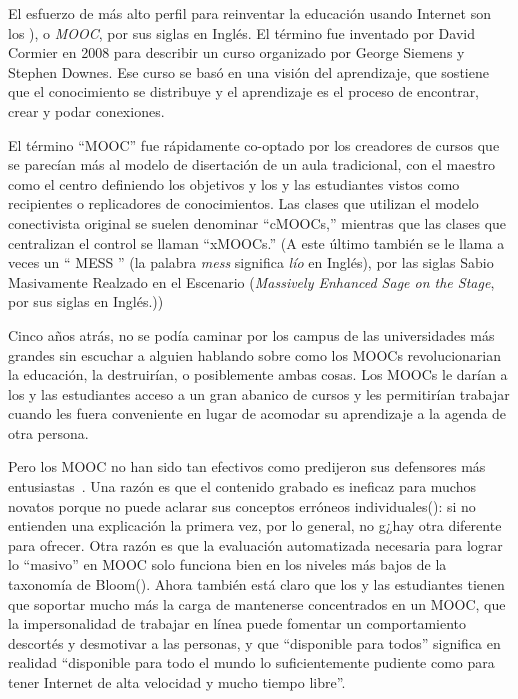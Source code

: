 
El esfuerzo de más alto perfil para reinventar la educación usando Internet
son los ), o \emph{MOOC}, por sus siglas en Inglés.
El término fue inventado por David Cormier en 2008
para describir un curso organizado por George Siemens
y Stephen Downes.
Ese curso se basó en una visión  del aprendizaje,
que sostiene que el conocimiento se distribuye
y el aprendizaje es el proceso de encontrar, crear y podar conexiones.

El término ``MOOC'' fue rápidamente co-optado por los creadores de
cursos que se parecían más al modelo de disertación de un aula tradicional,
con el maestro como el centro definiendo los objetivos
y los y las estudiantes vistos como recipientes o replicadores de conocimientos.
Las clases que utilizan el modelo conectivista original se suelen denominar ``cMOOCs,''
mientras que las clases que centralizan el control se llaman ``xMOOCs.''
(A este último también se le llama a veces un `` MESS '' (la palabra \emph{mess} significa \emph{lío} en Inglés),
por las siglas Sabio Masivamente Realzado en el Escenario (\emph{Massively Enhanced Sage on the Stage}, por sus siglas en Inglés.))

Cinco años atrás,
no se podía caminar por los campus de las universidades más grandes
sin escuchar a alguien hablando sobre como los MOOCs revolucionarian la educación,
la destruirían, 
o posiblemente ambas cosas.
Los MOOCs le darían a los y las estudiantes acceso a un gran abanico de cursos
y les permitirían trabajar cuando les fuera conveniente
en lugar de acomodar su aprendizaje a la agenda de otra persona.

Pero los MOOC no han sido tan efectivos
como predijeron sus defensores más entusiastas~\cite{Ubel2017}.
Una razón es que
el contenido grabado es ineficaz para muchos novatos
porque no puede aclarar sus conceptos erróneos individuales():
si no entienden una explicación la primera vez,
por lo general, no g¿hay otra diferente para ofrecer.
Otra razón es que la evaluación automatizada necesaria para lograr lo ``masivo'' en MOOC
solo funciona bien en los niveles más bajos de la taxonomía de Bloom().
Ahora también está claro que
los y las estudiantes tienen que soportar mucho más la carga de mantenerse concentrados en un MOOC,
que la impersonalidad de trabajar en línea puede fomentar un comportamiento descortés y desmotivar a las personas,
y que ``disponible para todos'' significa en realidad
``disponible para todo el mundo lo suficientemente pudiente como para tener Internet de alta velocidad y mucho tiempo libre''.

